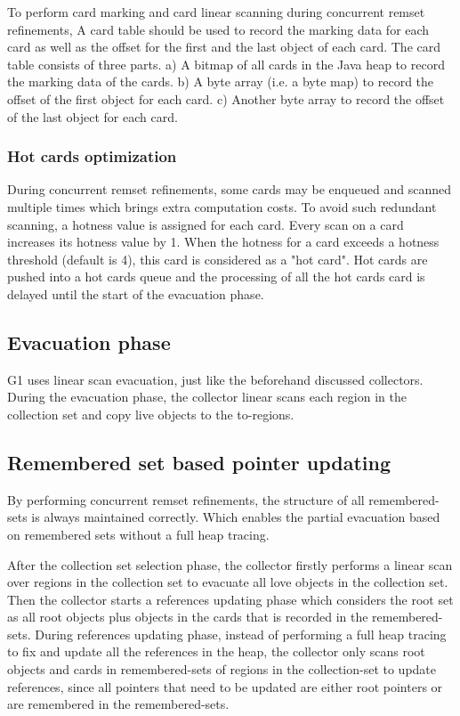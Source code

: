 To perform card marking and card linear scanning during concurrent remset refinements,
A card table should be used to record the marking data for each card as well as the offset
for the first and the last object of each card.
The card table consists of three parts. a) A bitmap of all cards in the Java heap
to record the marking data of the cards. b) A byte array (i.e. a byte map) to record the
offset of the first object for each card. c) Another byte array to record the
offset of the last object for each card.

\subsubsection{Hot cards optimization}

During concurrent remset refinements, some cards may be enqueued and scanned multiple times
which brings extra computation costs. To avoid such redundant scanning,
a hotness value is assigned for each card. Every scan on a card increases its hotness value by 1.
When the hotness for a card exceeds a hotness threshold (default is 4), this card is considered
as a "hot card". Hot cards are pushed into a hot cards queue and the processing
of all the hot cards card is delayed until the start of the evacuation phase.

\subsection{Evacuation phase}

G1 uses linear scan evacuation, just like the beforehand discussed collectors.
During the evacuation phase, the collector linear scans each region in the collection
set and copy live objects to the to-regions.

\subsection{Remembered set based pointer updating}

By performing concurrent remset refinements, the structure of all remembered-sets is always maintained correctly.
Which enables the partial evacuation based on remembered sets without a full heap tracing.

After the collection set selection phase, the collector firstly performs a linear
scan over regions in the collection set to evacuate all love objects in the collection set.
Then the collector starts a references updating phase which considers
the root set as all root objects plus objects in the cards that is recorded in the remembered-sets.
During references updating phase, instead of performing a full heap tracing to fix and
update all the references in the heap, the collector only scans root objects and
cards in remembered-sets of regions in the collection-set to update references,
since all pointers that need to be updated are either root pointers or are remembered in the remembered-sets.


